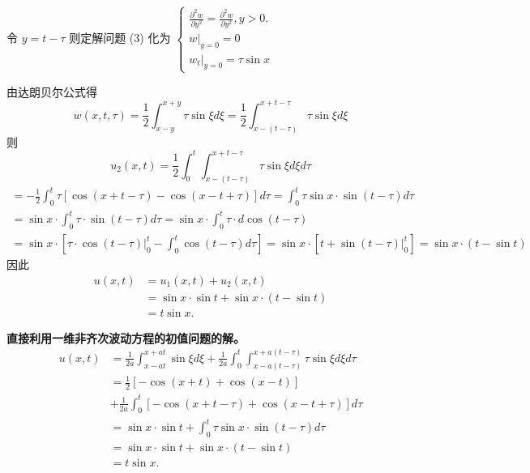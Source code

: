 \begin{questions}
\begin{solution}
令 $ y=t-\tau $
则定解问题 (3) 化为
$
\left\{\begin{array}{l}
\frac{\partial^{2} w}{\partial y^{2}}=\frac{\partial^{2} w}{\partial y^{2}}, y>0 . \\
\left.w\right|_{y=0}=0 \\
\left.w_{t}\right|_{y=0}=\tau \sin x
\end{array}\right.
$

由达朗贝尔公式得
$$
w(x, t, \tau)=\frac{1}{2} \int_{x-y}^{x+y} \tau \sin \xi d \xi=\frac{1}{2} \int_{x-(t-\tau)}^{x+t-\tau} \tau \sin \xi d \xi
$$
则$$ u_{2}(x, t)=\frac{1}{2} \int_{0}^{t} \int_{x-(t-\tau)}^{x+t-\tau} \tau \sin \xi d \xi d \tau $$
$$
\begin{array}{l}
=-\frac{1}{2} \int_{0}^{t} \tau[\cos (x+t-\tau)-\cos (x-t+\tau)] d \tau 
=\int_{0}^{t} \tau \sin x \cdot \sin (t-\tau) d \tau \\
=\sin x \cdot \int_{0}^{t} \tau \cdot \sin (t-\tau) d \tau 
=\sin x \cdot \int_{0}^{t} \tau \cdot d \cos (t-\tau) \\
=\sin x \cdot\left[\left.\tau \cdot \cos (t-\tau)\right|_{0} ^{t}-\int_{0}^{t} \cos (t-\tau) d \tau\right]
=\sin x \cdot\left[t+\left.\sin (t-\tau)\right|_{0} ^{t}\right] =\sin x \cdot(t-\sin t)
\end{array}
$$
因此
$$
\begin{aligned}
u(x, t) & =u_{1}(x, t)+u_{2}(x, t) \\
& =\sin x \cdot \sin t+\sin x \cdot(t-\sin t) \\
& =t \sin x .
\end{aligned}
$$


\textbf{直接利用一维非齐次波动方程的初值问题的解。}
$$
\begin{aligned}
u(x, t) & =\frac{1}{2 a} \int_{x-a t}^{x+a t} \sin \xi d \xi+\frac{1}{2 a} \int_{0}^{t} \int_{x-a(t-\tau)}^{x+a(t-\tau)} \tau \sin \xi d \xi d \tau \\
& =\frac{1}{2}[-\cos (x+t)+\cos (x-t)] \\
& +\frac{1}{2 a} \int_{0}^{t}[-\cos (x+t-\tau)+\cos (x-t+\tau)] d \tau \\
& =\sin x \cdot \sin t+\int_{0}^{t} \tau \sin x \cdot \sin (t-\tau) d \tau \\
& =\sin x \cdot \sin t+\sin x \cdot(t-\sin t) \\
& =t \sin x .
\end{aligned}
$$
\end{solution}
\end{questions}